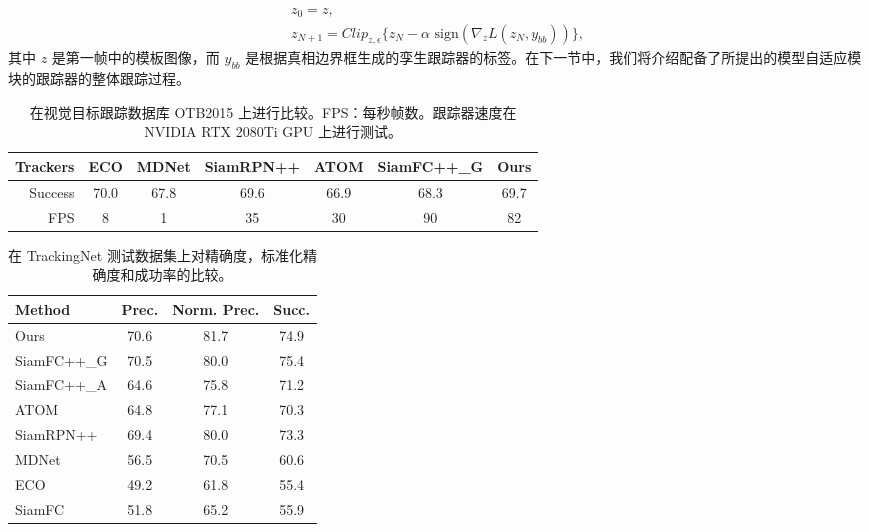 \begin{equation}
    \begin{gathered}
        z_0 = z,\\
        z_{N+1} = Clip_{z,\epsilon}\{z_N -\alpha \text{ sign}(\nabla_z L(z_N,y_{bb}))\},
    \end{gathered}
    \label{equ:adaptaion}
\end{equation}
其中 $z$ 是第一帧中的模板图像，而 $y_{bb}$ 是根据真相边界框生成的孪生跟踪器的标签。在下一节中，我们将介绍配备了所提出的模型自适应模块的跟踪器的整体跟踪过程。

\begin{table}[t]
\caption{在视觉目标跟踪数据库 OTB2015 上进行比较。FPS：每秒帧数。跟踪器速度在 NVIDIA RTX 2080Ti GPU 上进行测试。}
\setlength{\tabcolsep}{3pt}
\begin{center}
\begin{tabular}{r c c c c c c}
\toprule
Trackers & ECO & MDNet & SiamRPN++ & ATOM & SiamFC++\_G & Ours \\
\midrule
Success & 70.0 & 67.8  & 69.6      & 66.9      & 68.3       & 69.7 \\
FPS     & 8    & 1     & 35        & 30       & 90         & 82  \\
\bottomrule
\end{tabular}
\end{center}
\label{table:otb}
\end{table}

\begin{table}[t]
\centering
\caption{在 TrackingNet 测试数据集上对精确度，标准化精确度和成功率的比较。}
\begin{tabular}{l c c c}
\toprule
Method   &  Prec.   &  Norm. Prec. & Succ.  \\
\midrule
Ours  &  70.6&  81.7 &74.9 \\
SiamFC++\_G& 70.5 & 80.0 & 75.4 \\
SiamFC++\_A  & 64.6 & 75.8 & 71.2 \\
ATOM              & 64.8 & 77.1 & 70.3 \\
SiamRPN++&  69.4 & 80.0 &73.3 \\
MDNet	 &  56.5&  70.5 &60.6 \\
ECO	 &  49.2&  61.8 &55.4 \\
SiamFC	 &  51.8&  65.2 &55.9 \\
\bottomrule
\end{tabular}
\label{tabel:trackingnet}
\end{table}

